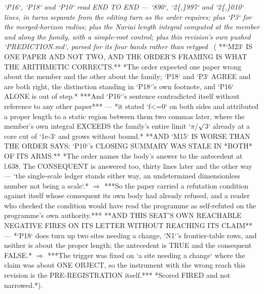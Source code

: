 \begin{description}
\textit{`P16`, `P18` and `P10` read END TO END --- `890`, `2\{,\}997` and `2\{,\}010` lines, in turns separate from the editing turn as the order requires; plus `P3` for the merged-horizon radius; plus the Nariai length integral computed at the member and along the family, with a simple-root control; plus this revision's own pushed `PREDICTION.md`, parsed for its four bands rather than retyped} \ ( **`M23` IS ONE PAPER AND NOT TWO, AND THE ORDER'S FRAMING IS WHAT THE ARITHMETIC CORRECTS.** *The order expected one paper wrong about the member and the other about the family; `P18` and `P3` AGREE and are both right, the distinction standing in `P18`'s own footnote, and `P16` ALONE is out of step.*  ***And `P16`'s sentence contradicted itself without reference to any other paper*** --- *it stated `f<=0` on both sides and attributed a proper length to a static region between them two commas later, where the member's own integral EXCEEDS the family's entire limit `\ensuremath{\pi}/\ensuremath{\surd}3` already at a core cut of `1e-3` and grows without bound.*  **AND `M15` IS WORSE THAN THE ORDER SAYS: `P10`'s CLOSING SUMMARY WAS STALE IN *BOTH* OF ITS ARMS.** *The order names the body's answer to the antecedent at l.638. The CONSEQUENT is answered too, thirty lines later and the other way --- `the single-scale ledger stands either way, an undetermined dimensionless number not being a scale`.* \ensuremath{\Rightarrow} ***So the paper carried a refutation condition against itself whose consequent its own body had already refused, and a reader who checked the condition would have read the programme as self-refuted on the programme's own authority.***  **AND THIS SEAT'S OWN REACHABLE NEGATIVE FIRES ON ITS LETTER WITHOUT REACHING ITS CLAIM** --- *`P18` does turn up two sites needing a change, `N1`'s frontier-table rows, and neither is about the proper length; the antecedent is TRUE and the consequent FALSE.* \ensuremath{\Rightarrow} ***The trigger was fixed on `a site needing a change` where the claim was about ONE OBJECT, so the instrument with the wrong reach this revision is the PRE-REGISTRATION itself.*** *Scored FIRED and not narrowed.*). 

\end{description}
